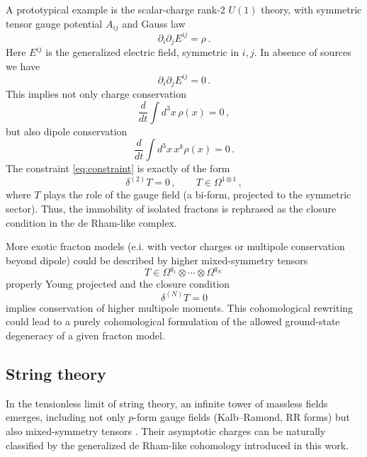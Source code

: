 \documentclass[a4paper,12pt]{article}
\begin{document}
A prototypical example is the scalar-charge rank-2 $U(1)$ theory, with symmetric tensor gauge potential $A_{ij}$ and Gauss law
\begin{equation}
\partial_i \partial_j E^{ij} = \rho \, .
\label{eq:gauss}
\end{equation}
Here $E^{ij}$ is the generalized electric field, symmetric in $i,j$. In absence of sources we have
\begin{equation}
\partial_i \partial_j E^{ij} = 0 \, .
\label{eq:constraint}
\end{equation}
This implies not only charge conservation
\begin{equation}
\frac{d}{dt} \int d^3x \, \rho(x) = 0 \, ,
\label{eq:charge_cons}
\end{equation}
but also dipole conservation
\begin{equation}
\frac{d}{dt} \int d^3x \, x^k \rho(x) = 0 \, .
\label{eq:dipole_cons}
\end{equation}
The constraint \eqref{eq:constraint} is exactly of the form
\begin{equation}
\delta^{(2)} T = 0 \, , \qquad T \in \Omega^{1 \otimes 1} \, ,
\end{equation}
where $T$ plays the role of the gauge field (a bi-form, projected to the symmetric sector). Thus, the immobility of isolated fractons is rephrased as the closure condition in the de Rham-like complex.

More exotic fracton models (e.i. with vector charges or multipole conservation beyond dipole) could be described by higher mixed-symmetry tensors
\begin{equation}
T \in \Omega^{q_1} \otimes \cdots \otimes \Omega^{q_N} \,
\end{equation}
properly Young projected and the closure condition
\begin{equation}
\delta^{(N)} T = 0
\end{equation}
implies conservation of higher multipole moments. This cohomological rewriting could lead to a purely cohomological formulation of the allowed ground-state degeneracy of a given fracton model.
\subsection{String theory}
In the tensionless limit of string theory, an infinite tower of massless fields emerges, including not only 
$p$-form gauge fields (Kalb--Ramond, RR forms) but also mixed-symmetry tensors \cite{Grana2005,Douglas2007,VanRietZoccarato2023,Shukla2021,SagnottiTsulaia2003,LindstromZabzine2003}. Their asymptotic charges can be naturally classified by the generalized de Rham-like cohomology introduced in this work.
\end{document}
